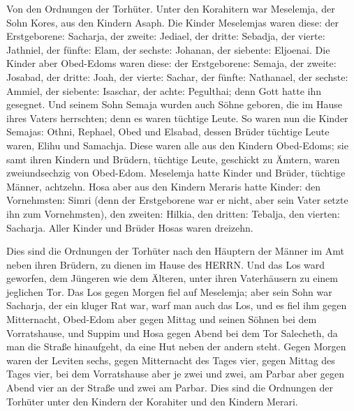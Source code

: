  Von den Ordnungen der Torhüter. Unter den Korahitern war
Meselemja, der Sohn Kores, aus den Kindern Asaph.  Die
Kinder Meselemjas waren diese: der Erstgeborene: Sacharja, der zweite:
Jediael, der dritte: Sebadja, der vierte: Jathniel,  der
fünfte: Elam, der sechste: Johanan, der siebente: Eljoenai. 
Die Kinder aber Obed-Edoms waren diese: der Erstgeborene: Semaja, der
zweite: Josabad, der dritte: Joah, der vierte: Sachar, der fünfte:
Nathanael,  der sechste: Ammiel, der siebente: Isaschar, der
achte: Pegulthai; denn Gott hatte ihn gesegnet.  Und seinem
Sohn Semaja wurden auch Söhne geboren, die im Hause ihres Vaters
herrschten; denn es waren tüchtige Leute.  So waren nun die
Kinder Semajas: Othni, Rephael, Obed und Elsabad, dessen Brüder tüchtige
Leute waren, Elihu und Samachja.  Diese waren alle aus den
Kindern Obed-Edoms; sie samt ihren Kindern und Brüdern, tüchtige Leute,
geschickt zu Ämtern, waren zweiundsechzig von Obed-Edom. 
Meselemja hatte Kinder und Brüder, tüchtige Männer, achtzehn.
 Hosa aber aus den Kindern Meraris hatte Kinder: den
Vornehmsten: Simri (denn der Erstgeborene war er nicht, aber sein Vater
setzte ihn zum Vornehmsten),  den zweiten: Hilkia, den
dritten: Tebalja, den vierten: Sacharja. Aller Kinder und Brüder Hosas
waren dreizehn.

 Dies sind die Ordnungen der Torhüter nach den Häuptern der
Männer im Amt neben ihren Brüdern, zu dienen im Hause des HERRN.
 Und das Los ward geworfen, dem Jüngeren wie dem Älteren,
unter ihren Vaterhäusern zu einem jeglichen Tor.  Das Los
gegen Morgen fiel auf Meselemja; aber sein Sohn war Sacharja, der ein
kluger Rat war, warf man auch das Los, und es fiel ihm gegen
Mitternacht,  Obed-Edom aber gegen Mittag und seinen Söhnen
bei dem Vorratshause,  und Suppim und Hosa gegen Abend bei
dem Tor Salecheth, da man die Straße hinaufgeht, da eine Hut neben der
andern steht.  Gegen Morgen waren der Leviten sechs, gegen
Mitternacht des Tages vier, gegen Mittag des Tages vier, bei dem
Vorratshause aber je zwei und zwei,  am Parbar aber gegen
Abend vier an der Straße und zwei am Parbar.  Dies sind die
Ordnungen der Torhüter unter den Kindern der Korahiter und den Kindern
Merari.

